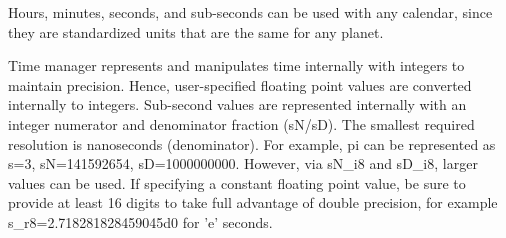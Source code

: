        Hours, minutes, seconds, and sub-seconds can be used with any calendar,
       since they are standardized units that are the same for any planet.
  
       Time manager represents and manipulates time internally with integers
       to maintain precision. Hence, user-specified floating point values are
       converted internally to integers.  Sub-second values are represented
       internally with an integer numerator and denominator fraction (sN/sD).
       The smallest required resolution is nanoseconds (denominator).
       For example, pi can be represented as s=3,
       sN=141592654, sD=1000000000.  However, via sN\_i8 and sD\_i8, larger
       values can be used.  If specifying a constant floating point value, be
       sure to provide at least 16 digits to take full advantage of double
       precision, for example s\_r8=2.718281828459045d0 for 'e' seconds.
  

